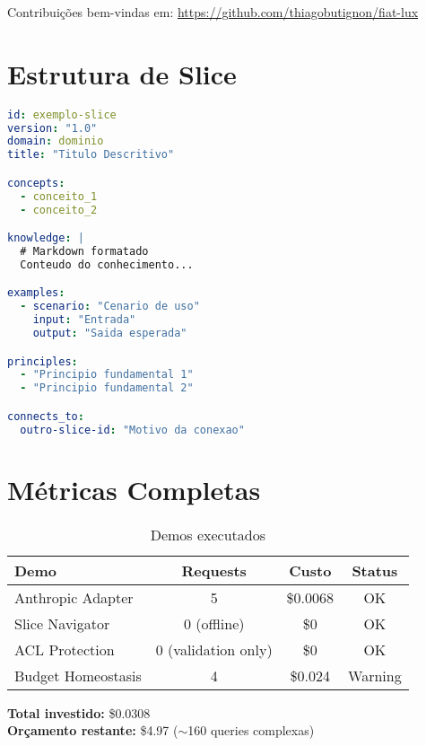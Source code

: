 \documentclass[11pt]{article}
\begin{document}
Contribuições bem-vindas em: \url{https://github.com/thiagobutignon/fiat-lux}

\section{Estrutura de Slice}

\begin{lstlisting}[language=yaml]
id: exemplo-slice
version: "1.0"
domain: dominio
title: "Titulo Descritivo"

concepts:
  - conceito_1
  - conceito_2

knowledge: |
  # Markdown formatado
  Conteudo do conhecimento...

examples:
  - scenario: "Cenario de uso"
    input: "Entrada"
    output: "Saida esperada"

principles:
  - "Principio fundamental 1"
  - "Principio fundamental 2"

connects_to:
  outro-slice-id: "Motivo da conexao"
\end{lstlisting}

\section{Métricas Completas}

\begin{table}[H]
\centering
\begin{tabular}{@{}lccc@{}}
\toprule
\textbf{Demo} & \textbf{Requests} & \textbf{Custo} & \textbf{Status} \\ \midrule
Anthropic Adapter & 5 & \$0.0068 & OK \\
Slice Navigator & 0 (offline) & \$0 & OK \\
ACL Protection & 0 (validation only) & \$0 & OK \\
Budget Homeostasis & 4 & \$0.024 & Warning \\ \bottomrule
\end{tabular}
\caption{Demos executados}
\end{table}

\textbf{Total investido:} \$0.0308\\
\textbf{Orçamento restante:} \$4.97 ($\sim$160 queries complexas)
\end{document}
